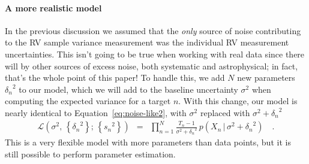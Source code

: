 \documentclass[modern, letterpaper]{aastex63}
\begin{document}
\paragraph{A more realistic model}

In the previous discussion we assumed that the \emph{only} source of noise contributing to the RV sample variance measurement was the individual RV measurement uncertainties.
This isn't going to be true when working with real data since there will by other sources of excess noise, both systematic and astrophysical; in fact, that's the whole point of this paper!
To handle this, we add $N$ new parameters ${\delta_n}^2$ to our model, which we will add to the baseline uncertainty $\sigma^2$ when computing the expected variance for a target $n$.
With this change, our model is nearly identical to Equation~\ref{eq:noise-like2}, with $\sigma^2$ replaced with $\sigma^2 + {\delta_n}^2$
\begin{eqnarray}
  \label{eq:noise-like3}
  \mathcal{L}(\sigma^2,\,\left\{{\delta_n}^2\right\};\,\left\{{s_n}^2\right\}) &=& \prod_{n=1}^N \frac{T_n - 1}{\sigma^2 + {\delta_n}^2}\,p(X_n\,|\,\sigma^2 + {\delta_n}^2) \quad.
\end{eqnarray}
This is a very flexible model with more parameters than data points, but it is still possible to perform parameter estimation.


\end{document}
